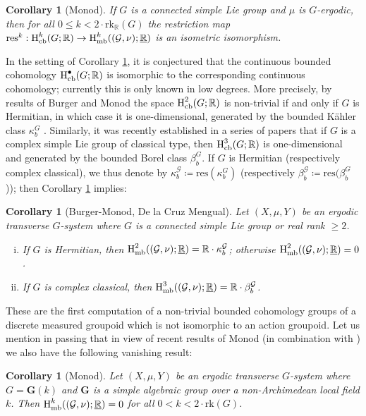 \documentclass[11pt, oneside]{amsart}
\newtheorem{intro_cor}[intro_thm]{Corollary}
\theoremstyle{definition}
\theoremstyle{remark}
\theoremstyle{TheoremNum}
\newcommand{\Hmb}{\textup{H}_{\textup{mb}}}
\newcommand{\Hcb}{\textup{H}_{\textup{cb}}}
\newcommand{\cG}{\mathcal{G}}
\newcommand{\bR}{\mathbb{R}}
\begin{document}
 \begin{intro_cor}[Monod]\label{2rk} 
If $G$ is a connected simple Lie group and $\mu$ is $G$-ergodic, then for all $0\leq k< 2 \cdot \mathrm{rk}_{\mathbb{R}}(G)$ the restriction map $\mathrm{res}^k:  \Hcb^k(G; \bR) \to  \Hmb^k((\cG, \nu);\underline{\bR})$ is an isometric isomorphism.
 \end{intro_cor}
 In the setting of Corollary \ref{2rk}, it is conjectured that the continuous bounded cohomology $ \Hcb^\bullet(G; \bR)$ is isomorphic to the corresponding continuous cohomology; currently this is only known in low degrees. More precisely, by results of Burger and Monod \cite{BuMo}
 the space $\Hcb^2(G;\bR)$ is non-trivial if and only if $G$ is Hermitian, in which case it is one-dimensional, generated by the bounded K\"ahler class $\kappa_b^G$ \cite{BuMo}. Similarly, it was recently established in a series of papers  \cite{DLCM,HDLCM1,HDLCM2} that if $G$ is a complex simple Lie group of classical type, then $\Hcb^3(G; \bR)$ is one-dimensional and generated by the bounded Borel class $\beta_b^G$. If $G$ is Hermitian (respectively complex classical), we thus denote by $\kappa_b^{\cG} \coloneqq \mathrm{res}(\kappa_b^G)$ (respectively $\beta_b^{\cG} \coloneqq \mathrm{res}(\beta_b^{G}$)); then Corollary \ref{2rk} implies:
 \begin{intro_cor}[Burger-Monod, De la Cruz Mengual]\label{intro_cor_2BC}
   Let $(X,\mu,Y)$ be an ergodic transverse $G$-system where $G$ is a connected simple Lie group or real rank $\geq 2$.
 \begin{enumerate}[(i)]
 \item If $G$ is Hermitian, then $\Hmb^2((\cG,\nu); \underline{\bR}) = \bR \cdot \kappa_b^{\cG}$; otherwise $\Hmb^2((\cG,\nu); \underline{\bR}) = 0$.
 \item If $G$ is complex classical, then  $\Hmb^3((\cG,\nu); \underline{\bR}) = \bR \cdot \beta_b^{\cG}$.
 \end{enumerate}
\end{intro_cor}
These are the first computation of a non-trivial bounded cohomology groups of a discrete measured groupoid which is not isomorphic to an action groupoid. Let us mention in passing that
in view of recent results of Monod \cite{Flatmates} (in combination with \cite{MonodSarithmetic}) we also have the following vanishing result:
\begin{intro_cor}[Monod]\label{intro_cor_Archimedean}
   Let $(X,\mu,Y)$ be an ergodic transverse $G$-system where $G = \mathbf{G}(k)$ and $\mathbf{G}$ is a simple algebraic group over a non-Archimedean local field $k$. Then $ \Hmb^k((\cG, \nu);\underline{\bR}) = 0$ for all $0<k<2 \cdot \mathrm{rk}(G)$.
\end{intro_cor}
\end{document}
